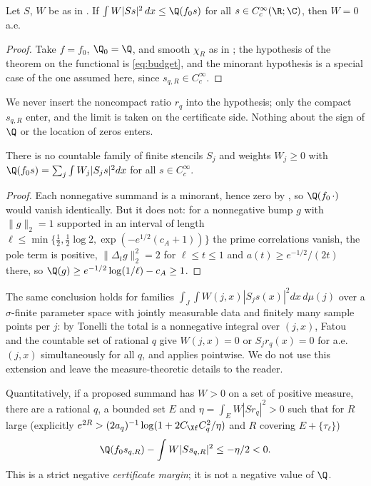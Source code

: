 \begin{corollary}\label{cor:nominorantWeil}
Let $S$, $W$ be as in . If $\int W|Ss|^2\,dx\le\Q(f_0s)$ for all $s\in C_c^\infty(\R;\C)$, then $W=0$ a.e.
\end{corollary}
\begin{proof}
Take $f=f_0$, $\Q_0=\Q$, and smooth $\chi_R$ as in ; the hypothesis of the theorem on the functional is \eqref{eq:budget},
and the minorant hypothesis is a special case of the one assumed here, since $s_{q,R}\in C_c^\infty$.
\end{proof}

We never insert the noncompact ratio $r_q$ into the hypothesis; only the compact $s_{q,R}$ enter, and the limit is taken
on the certificate side. Nothing about the sign of $\Q$ or the location of zeros enters.

\begin{corollary}\label{cor:noCSS}
There is no countable family of finite stencils $S_j$ and weights $W_j\ge0$ with
$\Q(f_0s)=\sum_j\int W_j|S_js|^2dx$ for all $s\in C_c^\infty$.
\end{corollary}
\begin{proof}
Each nonnegative summand is a minorant, hence zero by , so $\Q(f_0\,\cdot)$ would vanish identically.
But it does not: for a nonnegative bump $g$ with $\|g\|_2=1$ supported in an interval of length
$\ell\le\min\{\tfrac12,\tfrac12\log2,\exp(-e^{1/2}(c_A+1))\}$ the prime correlations vanish, the pole term is positive,
$\|\Delta_tg\|_2^2=2$ for $\ell\le t\le1$ and $a(t)\ge e^{-1/2}/(2t)$ there, so $\Q(g)\ge e^{-1/2}\log(1/\ell)-c_A\ge1$.
\end{proof}

\begin{remark}
The same conclusion holds for families $\int_J\!\int W(j,x)|S_js(x)|^2dx\,d\mu(j)$ over a $\sigma$-finite parameter space with jointly
measurable data and finitely many sample points per $j$: by Tonelli the total is a nonnegative integral over $(j,x)$, Fatou and the countable
set of rational $q$ give $W(j,x)=0$ or $S_jr_q(x)=0$ for a.e.\ $(j,x)$ simultaneously for all $q$, and  applies pointwise.
We do not use this extension and leave the measure-theoretic details to the reader.
\end{remark}

Quantitatively, if a proposed summand has $W>0$ on a set of positive measure, there are a rational $q$, a bounded set $E$
and $\eta=\int_EW|Sr_q|^2>0$ such that for $R$ large (explicitly $e^{2R}>(2a_q)^{-1}\log(1+2C_{\Xf}C_q^2/\eta)$ and $R$
covering $E+\{\tau_\ell\}$)
\begin{equation}\label{eq:certkill}
 \Q(f_0s_{q,R})-\int W|Ss_{q,R}|^2\le-\eta/2<0 .
\end{equation}
This is a strict negative \emph{certificate margin}; it is not a negative value of $\Q$.

